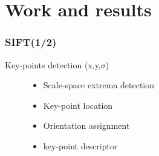 \documentclass[xcolor=table]{beamer}
\begin{document}
\section{Work and results}
\begin{frame} \frametitle{SIFT(1/2)}


Key-points detection (x,y,$\sigma$)


\begin{figure}[htbp]
    \begin{minipage}[c]{.45\linewidth}
      \begin{itemize}

    \item Scale-space extrema detection\\


    \item  Key-point location\\


    \item Orientation assignment\\


    \item key-point descriptor


\end{itemize}
\end{minipage}
\end{figure}
\end{frame}
\end{document}
